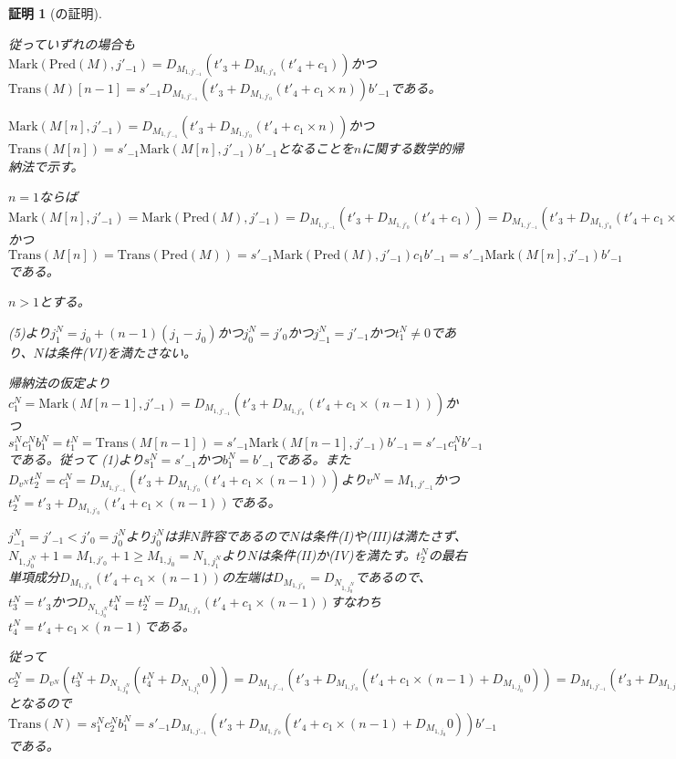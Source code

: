 \documentclass[dvipdfmx,uplatex]{jsarticle}
\theoremstyle{customnonumberbreakfortheorem}
\theoremstyle{customnonumberbreakforproof}
\newtheorem{hideableproof}{証明}
\begin{document}
\begin{hideableproof}[の証明]
\begin{indented}
\begin{indented}
\begin{indented}
\begin{indented}
				\end{indented}
				\item 従っていずれの場合も\(\textrm{Mark}(\textrm{Pred}(M),j'_{-1}) = D_{M_{1,j'_{-1}}}(t'_3 + D_{M_{1,j'_0}}(t'_4+c_1))\)かつ\(\textrm{Trans}(M)[n-1] = s'_{-1} D_{M_{1,j'_{-1}}}(t'_3 + D_{M_{1,j'_0}}(t'_4 + c_1 \times n)) b'_{-1}\)である。
				\item \(\textrm{Mark}(M[n],j'_{-1}) = D_{M_{1,j'_{-1}}}(t'_3 + D_{M_{1,j'_0}}(t'_4 + c_1 \times n))\)かつ\(\textrm{Trans}(M[n]) = s'_{-1} \textrm{Mark}(M[n],j'_{-1}) b'_{-1}\)となることを\(n\)に関する数学的帰納法で示す。
				\item \(n = 1\)ならば\(\textrm{Mark}(M[n],j'_{-1}) = \textrm{Mark}(\textrm{Pred}(M),j'_{-1}) = D_{M_{1,j'_{-1}}}(t'_3 + D_{M_{1,j'_0}}(t'_4 + c_1)) = D_{M_{1,j'_{-1}}}(t'_3 + D_{M_{1,j'_0}}(t'_4 + c_1 \times n))\)かつ\(\textrm{Trans}(M[n]) = \textrm{Trans}(\textrm{Pred}(M)) = s'_{-1} \textrm{Mark}(\textrm{Pred}(M),j'_{-1}) c_1 b'_{-1} = s'_{-1} \textrm{Mark}(M[n],j'_{-1}) b'_{-1}\)である。
				\item \(n > 1\)とする。
				\begin{indented}
					\item {} (5)より\(j_1^N = j_0+(n-1)(j_1-j_0)\)かつ\(j_0^N = j'_0\)かつ\(j_{-1}^N = j'_{-1}\)かつ\(t_1^N \neq 0\)であり、\(N\)は条件(VI)を満たさない。
					\item 帰納法の仮定より\(c_1^N = \textrm{Mark}(M[n-1],j'_{-1}) = D_{M_{1,j'_{-1}}}(t'_3 + D_{M_{1,j'_0}}(t'_4 + c_1 \times (n-1)))\)かつ\(s_1^N c_1^N b_1^N = t_1^N = \textrm{Trans}(M[n-1]) = s'_{-1} \textrm{Mark}(M[n-1],j'_{-1}) b'_{-1} = s'_{-1} c_1^N b'_{-1}\)である。従って (1)より\(s_1^N = s'_{-1}\)かつ\(b_1^N = b'_{-1}\)である。また\(D_{v^N} t_2^N = c_1^N = D_{M_{1,j'_{-1}}}(t'_3 + D_{M_{1,j'_0}}(t'_4 + c_1 \times (n-1)))\)より\(v^N = M_{1,j'_{-1}}\)かつ\(t_2^N = t'_3 + D_{M_{1,j'_0}}(t'_4 + c_1 \times (n-1))\)である。
					\item \(j_{-1}^N = j'_{-1} < j'_0 = j_0^N\)より\(j_0^N\)は非\(N\)許容であるので\(N\)は条件(I)や(III)は満たさず、\(N_{1,j_0^N}+1 = M_{1,j'_0}+1 \geq M_{1,j_0} = N_{1,j_1^N}\)より\(N\)は条件(II)か(IV)を満たす。\(t_2^N\)の最右単項成分\(D_{M_{1,j'_0}}(t'_4 + c_1 \times (n-1))\)の左端は\(D_{M_{1,j'_0}} = D_{N_{1,j_0^N}}\)であるので、\(t_3^N = t'_3\)かつ\(D_{N_{1,j_0^N}} t_4^N = t_2^N = D_{M_{1,j'_0}}(t'_4 + c_1 \times (n-1))\)すなわち\(t_4^N = t'_4 + c_1 \times (n-1)\)である。
					\item 従って\(c_2^N = D_{v^N}(t_3^N + D_{N_{1,j_0^N}}(t_4^N + D_{N_{1,j_1^N}} 0)) = D_{M_{1,j'_{-1}}}(t'_3 + D_{M_{1,j'_0}}(t'_4 + c_1 \times (n-1) + D_{M_{1,j_0}} 0)) = D_{M_{1,j'_{-1}}}(t'_3 + D_{M_{1,j'_0}}(t'_4 + c_1 \times (n-1) + D_{M_{1,j_0}} 0))\)となるので\(\textrm{Trans}(N) = s_1^N c_2^N b_1^N = s'_{-1} D_{M_{1,j'_{-1}}}(t'_3 +  D_{M_{1,j'_0}}(t'_4 + c_1 \times (n-1) + D_{M_{1,j_0}} 0)) b'_{-1}\)である。

\end{indented}
\end{indented}
\end{indented}
\end{indented}
\end{hideableproof}
\end{document}

